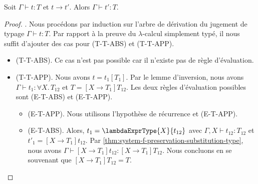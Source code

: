 \begin{theorem} 
  \label{thm:system-f-preservation}
  Soit $\Gamma \vdash t : T$ et $t \rightarrow t'$. Alors $\Gamma \vdash t' :
  T$.
\end{theorem}

\begin{proof}
  \label{thm:system-f-preservation-proof}. Nous procédons par induction sur
  l'arbre de dérivation du jugement de typage $\Gamma \vdash t : T$. Par rapport
  à la preuve du $\lambda$-calcul simplement typé, il nous
  suffit d'ajouter des cas pour (T-T-ABS) et (T-T-APP).

  \begin{itemize}
  \item (T-T-ABS). Ce cas n'est pas possible car il n'existe pas de règle d'évaluation.
  \item (T-T-APP). Nous avons $t = t_{1}[T_{1}]$. Par le lemme d'inversion, nous
    avons $\Gamma \vdash t_{1} : \forall X . \, T_{12}$ et $T = [X \rightarrow
  T_{1}] T_{12}$. Les deux règles d'évaluation possibles sont (E-T-ABS) et
  (E-T-APP).
    \begin{itemize}
    \item (E-T-APP). Nous utilisons l'hypothèse de récurrence et (E-T-APP).
    \item (E-T-ABS). Alors, $t_{1} = \lambdaExprType{X}{t_{12}}$ avec $\Gamma, X
      \vdash t_{12} : T_{12}$ et $t'_{1} = [X \rightarrow T_{1}] t_{12}$. Par
     \ref{thm:system-f-preservation-substitution-type}, nous avons $\Gamma \vdash
     [X \rightarrow T_{1}] t_{12} : [X \rightarrow T_{1}] T_{12}$. Nous concluons
     en se souvenant que $[X \rightarrow T_{1}]T_{12} = T$.
    \end{itemize}
  \end{itemize}
\end{proof}
